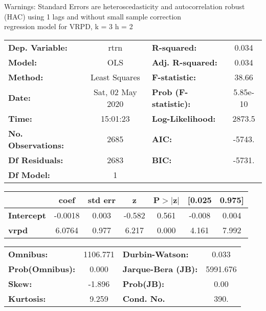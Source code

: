 Warnings: \newline
 [1] Standard Errors are heteroscedasticity and autocorrelation robust (HAC) using 1 lags and without small sample correction\\ 

regression model for VRPD, k = 3 h = 2\begin{center}
\begin{tabular}{lclc}
\toprule
\textbf{Dep. Variable:}    &       rtrn       & \textbf{  R-squared:         } &     0.034   \\
\textbf{Model:}            &       OLS        & \textbf{  Adj. R-squared:    } &     0.034   \\
\textbf{Method:}           &  Least Squares   & \textbf{  F-statistic:       } &     38.66   \\
\textbf{Date:}             & Sat, 02 May 2020 & \textbf{  Prob (F-statistic):} &  5.85e-10   \\
\textbf{Time:}             &     15:01:23     & \textbf{  Log-Likelihood:    } &    2873.5   \\
\textbf{No. Observations:} &        2685      & \textbf{  AIC:               } &    -5743.   \\
\textbf{Df Residuals:}     &        2683      & \textbf{  BIC:               } &    -5731.   \\
\textbf{Df Model:}         &           1      & \textbf{                     } &             \\
\bottomrule
\end{tabular}
\begin{tabular}{lcccccc}
                   & \textbf{coef} & \textbf{std err} & \textbf{z} & \textbf{P$> |$z$|$} & \textbf{[0.025} & \textbf{0.975]}  \\
\midrule
\textbf{Intercept} &      -0.0018  &        0.003     &    -0.582  &         0.561        &       -0.008    &        0.004     \\
\textbf{vrpd}      &       6.0764  &        0.977     &     6.217  &         0.000        &        4.161    &        7.992     \\
\bottomrule
\end{tabular}
\begin{tabular}{lclc}
\textbf{Omnibus:}       & 1106.771 & \textbf{  Durbin-Watson:     } &    0.033  \\
\textbf{Prob(Omnibus):} &   0.000  & \textbf{  Jarque-Bera (JB):  } & 5991.676  \\
\textbf{Skew:}          &  -1.896  & \textbf{  Prob(JB):          } &     0.00  \\
\textbf{Kurtosis:}      &   9.259  & \textbf{  Cond. No.          } &     390.  \\
\bottomrule
\end{tabular}
\end{center}

